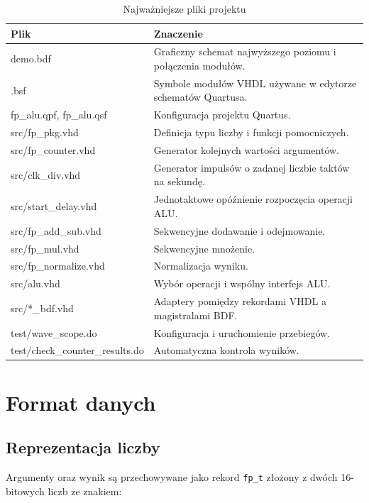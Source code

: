 \documentclass[12pt,a4paper]{article}
\begin{document}
\begin{table}[H]
    \centering
    \caption{Najważniejsze pliki projektu}
    \begin{tabularx}{\textwidth}{>{\raggedright\arraybackslash\ttfamily}p{}X}
        \toprule
        \normalfont Plik & Znaczenie \\
        \midrule
        demo.bdf & Graficzny schemat najwyższego poziomu i połączenia modułów. \\
        *.bsf & Symbole modułów VHDL używane w edytorze schematów Quartusa. \\
        fp\_alu.qpf, fp\_alu.qsf & Konfiguracja projektu Quartus. \\
        src/fp\_pkg.vhd & Definicja typu liczby i funkcji pomocniczych. \\
        src/fp\_counter.vhd & Generator kolejnych wartości argumentów. \\
        src/clk\_div.vhd & Generator impulsów o zadanej liczbie taktów na sekundę. \\
        src/start\_delay.vhd & Jednotaktowe opóźnienie rozpoczęcia operacji ALU. \\
        src/fp\_add\_sub.vhd & Sekwencyjne dodawanie i odejmowanie. \\
        src/fp\_mul.vhd & Sekwencyjne mnożenie. \\
        src/fp\_normalize.vhd & Normalizacja wyniku. \\
        src/alu.vhd & Wybór operacji i wspólny interfejs ALU. \\
        src/*\_bdf.vhd & Adaptery pomiędzy rekordami VHDL a magistralami BDF. \\
        test/wave\_scope.do & Konfiguracja i uruchomienie przebiegów. \\
        test/check\_counter\_\allowbreak{}results.do & Automatyczna kontrola wyników. \\
        \bottomrule
    \end{tabularx}
\end{table}

\section{Format danych}

\subsection{Reprezentacja liczby}

Argumenty oraz wynik są przechowywane jako rekord \texttt{fp\_t} złożony
z dwóch 16-bitowych liczb ze znakiem:
\end{document}
